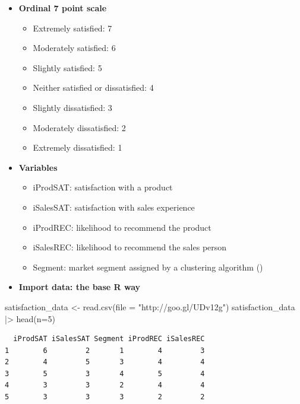 \documentclass[
  ignorenonframetext,
]{beamer}
\newenvironment{Shaded}{\begin{snugshade}}{\end{snugshade}}
\newcommand{\AttributeTok}[1]{\textcolor[rgb]{0.40,0.45,0.13}{#1}}
\newcommand{\DecValTok}[1]{\textcolor[rgb]{0.68,0.00,0.00}{#1}}
\newcommand{\FunctionTok}[1]{\textcolor[rgb]{0.28,0.35,0.67}{#1}}
\newcommand{\NormalTok}[1]{\textcolor[rgb]{0.00,0.23,0.31}{#1}}
\newcommand{\OtherTok}[1]{\textcolor[rgb]{0.00,0.23,0.31}{#1}}
\newcommand{\SpecialCharTok}[1]{\textcolor[rgb]{0.37,0.37,0.37}{#1}}
\newcommand{\StringTok}[1]{\textcolor[rgb]{0.13,0.47,0.30}{#1}}
\providecommand{\tightlist}{%
  \setlength{\itemsep}{0pt}\setlength{\parskip}{0pt}}\usepackage{longtable,booktabs,array}
\begin{document}
\begin{frame}{}
\label{section-2}
\begin{itemize}
\item
  \textbf{Ordinal 7 point scale}

  \begin{itemize}
  \tightlist
  \item
    Extremely satisfied: 7
  \item
    Moderately satisfied: 6
  \item
    Slightly satisfied: 5
  \item
    Neither satisfied or dissatisfied: 4
  \item
    Slightly dissatisfied: 3
  \item
    Moderately dissatisfied: 2
  \item
    Extremely dissatisfied: 1
  \end{itemize}
\item
  \textbf{Variables}

  \begin{itemize}
  \tightlist
  \item
    iProdSAT: satisfaction with a product
  \item
    iSalesSAT: satisfaction with sales experience
  \item
    iProdREC: likelihood to recommend the product
  \item
    iSalesREC: likelihood to recommend the sales person
  \item
    Segment: market segment assigned by a clustering algorithm
    ()
  \end{itemize}
\end{itemize}
\end{frame}

\begin{frame}[fragile]{}
\label{section-3}
\begin{itemize}
\tightlist
\item
  \textbf{Import data: the base R way}
\end{itemize}

\tiny

\begin{Shaded}
\begin{Highlighting}[]
\NormalTok{satisfaction\_data }\OtherTok{\textless{}{-}} \FunctionTok{read.csv}\NormalTok{(}\AttributeTok{file =} \StringTok{"http://goo.gl/UDv12g"}\NormalTok{)}
\NormalTok{satisfaction\_data }\SpecialCharTok{|\textgreater{}} \FunctionTok{head}\NormalTok{(}\AttributeTok{n=}\DecValTok{5}\NormalTok{)}
\end{Highlighting}
\end{Shaded}

\begin{verbatim}
  iProdSAT iSalesSAT Segment iProdREC iSalesREC
1        6         2       1        4         3
2        4         5       3        4         4
3        5         3       4        5         4
4        3         3       2        4         4
5        3         3       3        2         2
\end{verbatim}
\end{frame}
\end{document}
